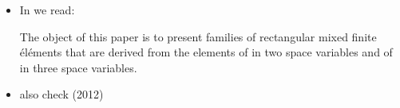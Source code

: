 \begin{itemize}
\begin{eqnarray}
\vec{\bN}_3 &=&  \left(\begin{array}{c} -2x-6y+2 \\ 4y   \end{array}\right) \nn\\  
\vec{\bN}_4 &=&  \left(\begin{array}{c} 2x \\ -6x-4y+4   \end{array}\right) \nn\\  
\vec{\bN}_5 &=&  \left(\begin{array}{c} -4x \\ 6x +2y -2 \end{array}\right) \nn
\end{eqnarray}

 

\item In \cite{brdf87} we read:
\begin{displayquote}
The object of this paper is to present families of rectangular mixed finite
éléments that are derived from the elements of \cite{brdm85} 
in two space variables and of \cite{brdd87} in three space variables.
\end{displayquote}


\item also check \textcite{ervi12} (2012)

\end{itemize}

